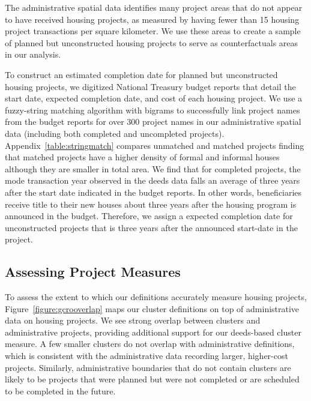 \documentclass[12pt]{article}
\begin{document}
The administrative spatial data identifies many project areas that do not appear to have received housing projects, as measured by having fewer than 15 housing project transactions per square kilometer.  We use these areas to create a sample of planned but unconstructed housing projects to serve as counterfactuals areas in our analysis.

To construct an estimated completion date for planned but unconstructed housing projects, we digitized National Treasury budget reports that detail the start date, expected completion date, and cost of each housing project.  We use a fuzzy-string matching algorithm with bigrams to successfully link project names from the budget reports for over 300 project names in our administrative spatial data (including both completed and uncompleted projects).  Appendix~\ref{table:stringmatch} compares unmatched and matched projects finding that matched projects have a higher density of formal and informal houses although they are smaller in total area.  We find that for completed projects, the mode transaction year observed in the deeds data falls an average of three years after the start date indicated in the budget reports.  In other words, beneficiaries receive title to their new houses about three years after the housing program is announced in the budget.  Therefore, we assign a expected completion date for unconstructed projects that is three years after the announced start-date in the project.  


\subsection{Assessing Project Measures}

To assess the extent to which our definitions accurately measure housing projects, Figure~\ref{figure:gcrooverlap} maps our cluster definitions on top of administrative data on housing projects.  We see strong overlap between clusters and administrative projects, providing additional support for our deeds-based cluster measure.  A few smaller clusters do not overlap with administrative definitions, which is consistent with the administrative data recording larger, higher-cost projects.  Similarly, administrative boundaries that do not contain clusters are likely to be projects that were planned but were not completed or are scheduled to be completed in the future.
\end{document}
